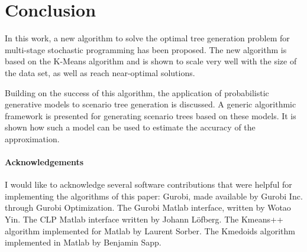 \section{Conclusion}
In this work, a new algorithm to solve the optimal tree generation problem for multi-stage stochastic programming has been proposed.
The new algorithm is based on the K-Means algorithm and is shown to scale very well with the size of the data set, as well as reach near-optimal solutions.

Building on the success of this algorithm, the application of probabilistic generative models to scenario tree generation is discussed.
A generic algorithmic framework is presented for generating scenario trees based on these models.
It is shown how such a model can be used to estimate the accuracy of the approximation.
\paragraph{Acknowledgements}
I would like to acknowledge several software contributions that were helpful for implementing the algorithms of this paper: Gurobi, made available by Gurobi Inc. through Gurobi Optimization. The Gurobi Matlab interface, written by Wotao Yin. The CLP Matlab interface written by Johann L\"{o}fberg. The Kmeans++ algorithm implemented for Matlab by Laurent Sorber. The Kmedoids algorithm implemented in Matlab by Benjamin Sapp.
